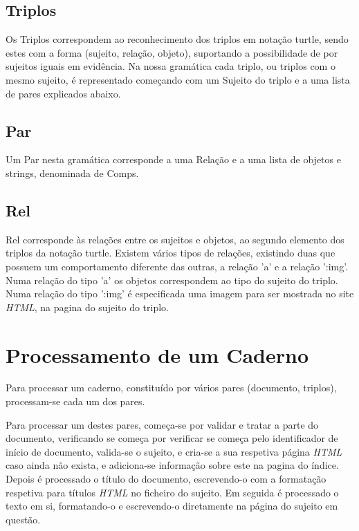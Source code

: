 \documentclass[a4paper]{report}
\begin{document}
\subsection{Triplos}

Os Triplos correspondem ao reconhecimento dos triplos em notação turtle, sendo
estes com a forma (sujeito, relação, objeto), suportando a possibilidade de por
sujeitos iguais em evidência. Na nossa gramática cada triplo, ou triplos com o
mesmo sujeito, é representado começando com um Sujeito do triplo e a uma lista
de pares explicados abaixo.

\subsection{Par}

Um Par nesta gramática corresponde a uma Relação e a uma lista de objetos e
strings, denominada de Comps. 

\subsection{Rel}

Rel corresponde às relações entre os sujeitos e objetos, ao segundo elemento dos
triplos da notação turtle. Existem vários tipos de relações, existindo duas que
possuem um comportamento diferente das outras, a relação 'a' e a relação ':img'.
Numa relação do tipo 'a' os objetos correspondem ao tipo do sujeito do triplo.
Numa relação do tipo ':img' é especificada uma imagem para ser mostrada no site
\textit{HTML}, na pagina do sujeito do triplo.

\section{Processamento de um Caderno}

Para processar um caderno, constituído por vários pares (documento, triplos),
processam-se cada um dos pares.

Para processar um destes pares, começa-se por validar e tratar a parte do
documento, verificando se começa por verificar se começa pelo identificador de
início de documento, valida-se o sujeito, e cria-se a sua respetiva página
\textit{HTML} caso ainda não exista, e adiciona-se informação sobre este na
pagina do índice. Depois é processado o título do documento, escrevendo-o com a
formatação respetiva para títulos \textit{HTML} no ficheiro do sujeito. Em
seguida é processado o texto em si, formatando-o e escrevendo-o diretamente na
página do sujeito em questão.
\end{document}
